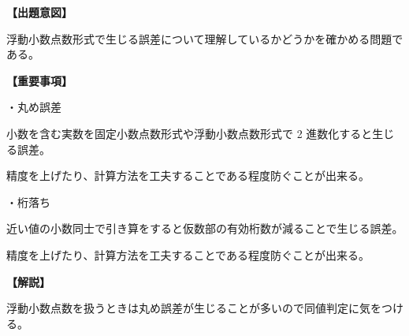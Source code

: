 \noindent \textbf{【出題意図】}

\noindent 浮動小数点数形式で生じる誤差について理解しているかどうかを確かめる問題である。

\vspace{1em}
\noindent \textbf{【重要事項】}

\medskip
\noindent ・丸め誤差

\medskip
\noindent 小数を含む実数を固定小数点数形式や浮動小数点数形式で 2 進数化すると生じる誤差。

\noindent 精度を上げたり、計算方法を工夫することである程度防ぐことが出来る。

\medskip
\noindent ・桁落ち

\medskip
\noindent 近い値の小数同士で引き算をすると仮数部の有効桁数が減ることで生じる誤差。

\noindent 精度を上げたり、計算方法を工夫することである程度防ぐことが出来る。


\vspace{1em}
\noindent \textbf{【解説】}

\noindent 浮動小数点数を扱うときは丸め誤差が生じることが多いので同値判定に気をつける。
